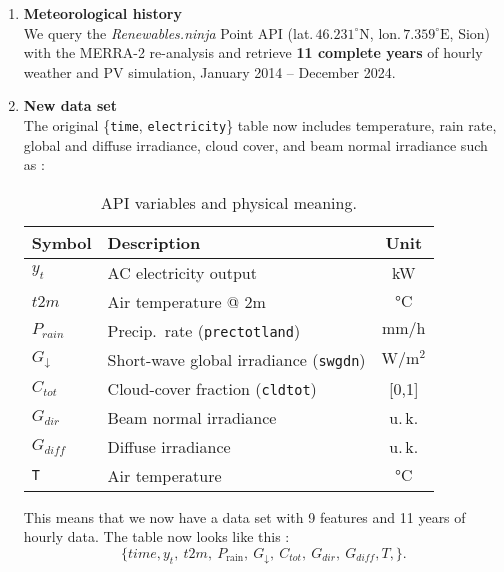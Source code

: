 \begin{enumerate}[leftmargin=1.2em]
  \item \textbf{Meteorological history}\\  
        We query the \emph{Renewables.ninja} Point API
        (lat.\,$46.231^{\circ}\mathrm{N}$, lon.\,$7.359^{\circ}\mathrm{E}$,
        Sion) with the MERRA-2 re-analysis and retrieve \textbf{11 complete
        years} of hourly weather and PV simulation, January 2014 – December 2024.
  \item \textbf{New data set} \\ 
        The original \{\texttt{time}, \texttt{electricity}\} table now includes
        temperature, rain rate, global and diffuse irradiance, cloud cover, and
        beam normal irradiance such as : 
    
        \begin{table}[h]
        \centering
        \caption{API variables and physical meaning.}
        \label{tab:raw-vars}
        \begin{tabular}{llc}
        \hline
        Symbol & Description & Unit \\ \hline
        $y_t$  & AC electricity output & kW \\
        $t2m$  & Air temperature @ 2m & $\si{\celsius}$ \\
        $P_{rain}$ & Precip.\ rate (\texttt{prectotland}) & $\si{\milli\metre\per\hour}$\\
        $G_{\!\downarrow}$ & Short-wave global irradiance (\texttt{swgdn}) & $\si{\watt\per\square\metre}$\\
        $C_{tot}$ & Cloud-cover fraction (\texttt{cldtot}) & [0,1] \\
        $G_{dir}$ & Beam normal irradiance & u.\,k. \\
        $G_{diff}$ & Diffuse irradiance & u.\,k. \\
        \texttt{T} & Air temperature & $\si{\celsius}$ \\
        \hline
        \end{tabular}
        \end{table}

        This means that we now have a data set with 9 features and 11 years of hourly data.
        The table now looks like this :
        \[
            \bigl\{
            time , y_t,\ t2m,\ P_{\text{rain}},\ G_{\!\downarrow},\ C_{tot},\
            G_{dir},\ G_{diff}, T, \bigr\}.
        \]
\end{enumerate}

